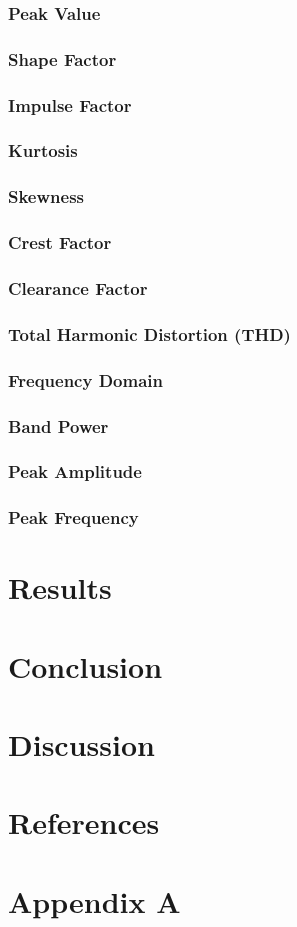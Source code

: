 \documentclass{article}
\begin{document}
  \subsubsection{Peak Value} 
  \subsubsection{Shape Factor} 
  \subsubsection{Impulse Factor} 
  \subsubsection{Kurtosis} 
  \subsubsection{Skewness} 
  \subsubsection{Crest Factor} 
  \subsubsection{Clearance Factor} 
  \subsubsection{Total Harmonic Distortion (THD)}   

  \newpage 
  \subsubsection{Frequency Domain}
  \subsubsection{Band Power}
  \subsubsection{Peak Amplitude}
  \subsubsection{Peak Frequency}

  \newpage  
  \section{Results}

  \newpage  
  \section{Conclusion}

  \newpage 
  \section{Discussion} 

  \newpage  
  \section{References} 
  
   

  \newpage  
  \section{Appendix A}
\end{document}
